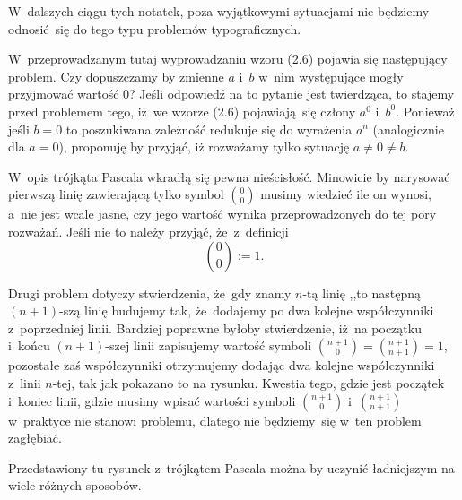 \documentclass[a4paper,11pt]{article}
\begin{document}
W~dalszych ciągu tych notatek, poza wyjątkowymi sytuacjami nie będziemy
odnosić~się do tego typu problemów typograficznych.

\vspace{\spaceFour}





 W~przeprowadzanym tutaj wyprowadzaniu wzoru (2.6) pojawia się
następujący problem. Czy dopuszczamy by zmienne $a$ i~$b$ w~nim występujące
mogły przyjmować wartość $0$? Jeśli odpowiedź na to pytanie jest twierdząca,
to stajemy przed problemem tego, iż~we wzorze (2.6) pojawiają~się
człony $a^{ 0 }$ i~$b^{ 0 }$. Ponieważ jeśli $b = 0$ to poszukiwana zależność
redukuje się do wyrażenia $a^{ n }$ (analogicznie dla $a = 0$), proponuję by
przyjąć, iż rozważamy tylko sytuację $a \neq 0 \neq b$.

\vspace{\spaceFour}





 W~opis trójkąta Pascala wkradłą się pewna nieścisłość. Minowicie by
narysować pierwszą linię zawierającą tylko symbol $\binom{ 0 }{ 0 }$ musimy wiedzieć
ile on wynosi, a~nie jest wcale jasne, czy jego wartość wynika przeprowadzonych 
do tej pory rozważań. Jeśli nie to należy przyjąć, że~z~definicji
\begin{equation}
  \label{Gancarzewicz-Arytmetyka-03}
  \binom{ 0 }{ 0 } := 1.
\end{equation}

Drugi problem dotyczy stwierdzenia, że~gdy znamy $n$-tą linię ,,to następną $( n + 1 )$-szą linię
budujemy tak, że~dodajemy po dwa kolejne współczynniki z~poprzedniej linii. Bardziej poprawne byłoby
stwierdzenie, iż~na początku i~końcu $( n + 1 )$-szej linii zapisujemy wartość symboli 
$\binom{ n + 1 }{ 0 } = \binom{ n + 1 }{ n + 1 } = 1$, pozostałe zaś współczynniki otrzymujemy
dodając dwa kolejne współczynniki z~linii $n$-tej, tak jak pokazano to na rysunku. Kwestia tego,
gdzie jest początek i~koniec linii, gdzie musimy wpisać wartości symboli $\binom{ n + 1 }{ 0 }$ 
i~$\binom{ n + 1 }{ n + 1 }$ w~praktyce nie stanowi problemu, dlatego nie będziemy~się w~ten problem
zagłębiać.

\vspace{\spaceFour}





 Przedstawiony tu rysunek z~trójkątem Pascala można by uczynić ładniejszym na wiele różnych sposobów.
\end{document}
